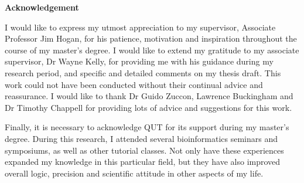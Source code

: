 


\begin{center}
\textbf{\LARGE Acknowledgement} \\
\end{center}

I would like to express my utmost appreciation to my supervisor, Associate Professor Jim Hogan, for his patience, motivation and inspiration throughout the course of my master’s degree. I would like to extend my gratitude to my associate supervisor, Dr Wayne Kelly, for providing me with his guidance during my research period, and specific and detailed comments on my thesis draft. This work could not have been conducted without their continual advice and reassurance. I would like to thank Dr Guido Zuccon, Lawrence Buckingham and Dr Timothy Chappell for providing lots of advice and suggestions for this work.

Finally, it is necessary to acknowledge QUT for its support during my master’s degree. During this research, I attended several bioinformatics seminars and symposiums, as well as other tutorial classes. Not only have these experiences expanded my knowledge in this particular field, but they have also improved overall logic, precision and scientific attitude in other aspects of my life.
